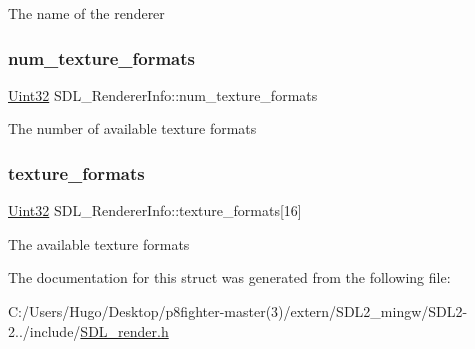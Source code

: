 The name of the renderer \mbox{\label{struct_s_d_l___renderer_info_acdec165b2053b914313f5996983ec6b8}} 
\subsubsection{\texorpdfstring{num\+\_\+texture\+\_\+formats}{num\_texture\_formats}}
{\footnotesize\ttfamily \hyperlink{_s_d_l__stdinc_8h_add440eff171ea5f55cb00c4a9ab8672d}{Uint32} S\+D\+L\+\_\+\+Renderer\+Info\+::num\+\_\+texture\+\_\+formats}

The number of available texture formats \mbox{\label{struct_s_d_l___renderer_info_a88450f9d48e593ec4571e3ba7cc3427d}} 
\subsubsection{\texorpdfstring{texture\+\_\+formats}{texture\_formats}}
{\footnotesize\ttfamily \hyperlink{_s_d_l__stdinc_8h_add440eff171ea5f55cb00c4a9ab8672d}{Uint32} S\+D\+L\+\_\+\+Renderer\+Info\+::texture\+\_\+formats\mbox{[}16\mbox{]}}

The available texture formats 

The documentation for this struct was generated from the following file\+:\begin{DoxyCompactItemize}
\item 
C\+:/\+Users/\+Hugo/\+Desktop/p8fighter-\/master(3)/extern/\+S\+D\+L2\+\_\+mingw/\+S\+D\+L2-\/2../include/\hyperlink{_s_d_l__render_8h}{S\+D\+L\+\_\+render.\+h}\end{DoxyCompactItemize}
